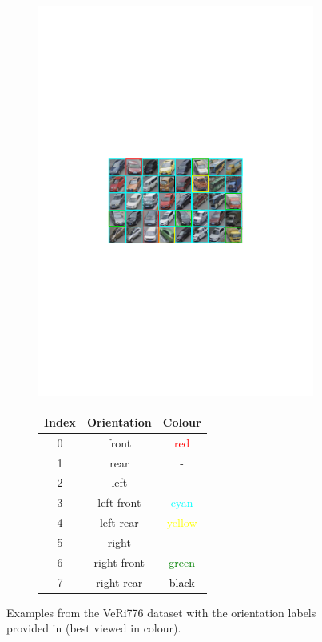 \documentclass[10pt,twocolumn,letterpaper]{article}
\begin{document}
\begin{figure}[t]
  \begin{subfigure}{.6\textwidth}
    \includegraphics[width=\linewidth,trim=5cm 11cm 5cm 11cm,clip=true]{images/veri_orients.pdf}
  \end{subfigure}
  \begin{subfigure}{.4\textwidth}
    \centering
    \begin{tabular}{c | c | c}
      \hline
      Index & Orientation & Colour \\
      \hline
      0 & front & \textcolor{red}{red} \\
      1 & rear & - \\
      2 & left  & - \\
      3 & left front & \textcolor{cyan}{cyan}  \\
      4 & left rear & \textcolor{yellow}{yellow}  \\
      5 & right  & - \\
      6 & right front & \textcolor{green}{green} \\
      7 & right rear & \textcolor{black}{black} \\
      \hline
    \end{tabular}
  \end{subfigure}
  \caption{Examples from the VeRi776 dataset with the orientation labels provided in \cite{wang2017orientation} (best viewed in colour).}
  \label{T:veri_veh_orientations}
\end{figure}
\end{document}
